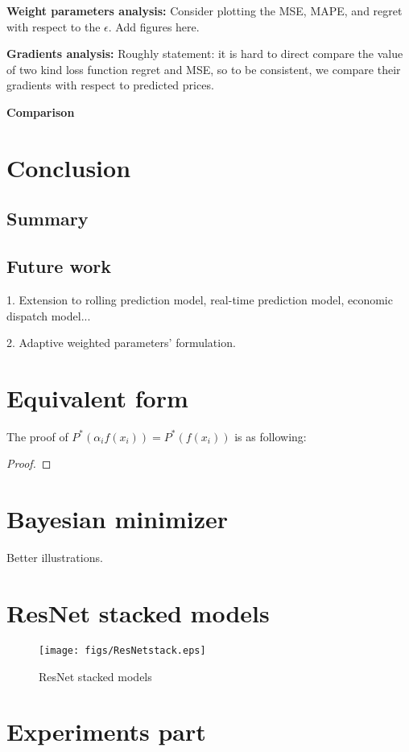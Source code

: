 \documentclass[journal]{IEEEtran}
\newcommand{\slw}{\color{blue}}
\begin{document}
\textbf{Weight parameters analysis:}
{\slw Consider plotting the MSE, MAPE, and regret with respect to the $\epsilon$. Add figures here.}

\textbf{Gradients analysis:} 
{\slw Roughly statement: it is hard to direct compare the value of two kind loss function regret and MSE, so to be consistent, we compare their gradients with respect to predicted prices.}

\textbf{Comparison}

\section{Conclusion}
\subsection{Summary}

\subsection{Future work}
1. Extension to rolling prediction model, real-time prediction model, economic dispatch model...

2. Adaptive weighted parameters' formulation.

\appendices

\section{Equivalent form}
The proof of $P^*(\alpha_i f(x_i)) = P^*(f(x_i))$ is as following:
\begin{proof}
  
\end{proof}

\section{Bayesian minimizer}
Better illustrations.

\section{ResNet stacked models}


\begin{figure}[h]
  \centering
  \texttt{[image: figs/ResNetstack.eps]}
  \caption{ResNet stacked models}
  \label{ResNetstack}
\end{figure}

\section{Experiments part}
\end{document}
